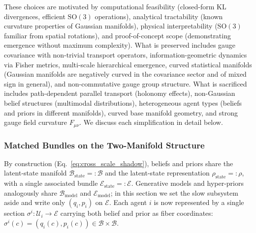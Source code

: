 \documentclass[11pt]{article}
\begin{document}
These choices are motivated by computational feasibility (closed-form KL divergences, efficient $\mathrm{SO}(3)$ operations), analytical tractability (known curvature properties of Gaussian manifolds), physical interpretability ($\mathrm{SO}(3)$ familiar from spatial rotations), and proof-of-concept scope (demonstrating emergence without maximum complexity). What is preserved includes gauge covariance with non-trivial transport operators, information-geometric dynamics via Fisher metrics, multi-scale hierarchical emergence, curved statistical manifolds (Gaussian manifolds are negatively curved in the covariance sector and of mixed sign in general), and non-commutative gauge group structure. What is sacrificed includes path-dependent parallel transport (holonomy effects), non-Gaussian belief structures (multimodal distributions), heterogeneous agent types (beliefs and priors in different manifolds), curved base manifold geometry, and strong gauge field curvature $F_{\mu\nu}$. We discuss each simplification in detail below.

\subsubsection{Matched Bundles on the Two-Manifold Structure}

By construction (Eq.~\eqref{eq:cross_scale_shadow}), beliefs and priors share the latent-state manifold $\mathcal{B}_{\mathrm{state}} =: \mathcal{B}$ and the latent-state representation $\rho_{\mathrm{state}} =: \rho$, with a single associated bundle $\mathcal{E}_{\mathrm{state}} =: \mathcal{E}$. Generative models and hyper-priors analogously share $\mathcal{B}_{\mathrm{model}}$ and $\mathcal{E}_{\mathrm{model}}$; in this section we set the slow subsystem aside and write only $(q_i, p_i)$ on $\mathcal{E}$. Each agent $i$ is now represented by a single section $\sigma^i: \mathcal{U}_i \to \mathcal{E}$ carrying both belief and prior as fiber coordinates: $\sigma^i(c) = (q_i(c), p_i(c)) \in \mathcal{B} \times \mathcal{B}$.
\end{document}
